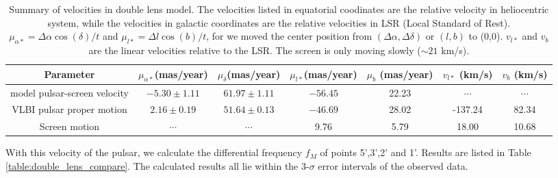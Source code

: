 \documentclass[useAMS,usenatbib]{mn2e}
\begin{document}
\begin{table}
\centering
\begin{tabular}{c|cccccc}
\hline
Parameter & $\mu_{\alpha*}$(mas/year) & $\mu_{\delta}$(mas/year) & $\mu_{l*}$(mas/year) & $\mu_b$ (mas/year) & $v_{l*}$ (km/s) & $v_b$ (km/s) \\
\hline
model pulsar-screen velocity & $-5.30 \pm 1.11$  & $61.97 \pm 1.11$  & $-56.45$ & 22.23 &  $\cdots$ & $\cdots$\\
VLBI pulsar proper motion & $2.16 \pm 0.19$ & $51.64 \pm 0.13$ & $-46.69$ & 28.02 & -137.24 & 82.34 \\
Screen motion & $\cdots$ & $\cdots$  & 9.76 & 5.79 & 18.00 & 10.68\\
\hline
\end{tabular}
\caption{Summary of velocities in double lens model. The velocities
listed in equatorial coodinates are the relative velocity in
heliocentric system, while the velocities in galactic coordinates are
the relative velocities in LSR (Local Standard of Rest). $\mu_{\alpha*}=\Delta\alpha\cos(\delta)/t$ and $\mu_{l*}=\Delta l\cos(b)/t$, for we moved the center position from $(\Delta\alpha,\Delta\delta)$ or $(l,b)$ to (0,0). $v_{l*}$ and $v_b$ are the linear velocities relative to the LSR. The screen is
only moving slowly ($\sim 21$ km/s).
}
\label{Table:velocity}
\end{table}





With this velocity of the pulsar, we calculate the differential frequency $f_M$ of points 5',3',2' and 1'. Results are listed in Table \ref{table:double_lens_compare}. The calculated results all lie within the 3-$\sigma$ error intervals of the observed data. 
\end{document}
